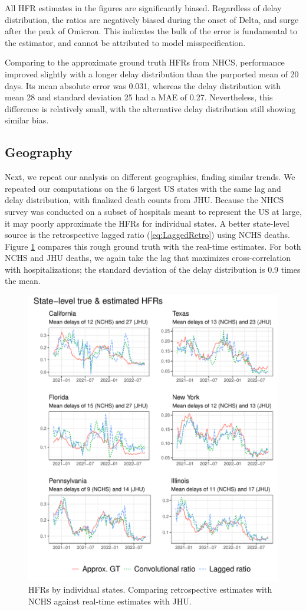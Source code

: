 \documentclass{article}
\begin{document}
All HFR estimates in the figures are significantly biased. Regardless of delay distribution, the ratios are negatively biased during the onset of Delta, and surge after the peak of Omicron. This indicates the bulk of the error is fundamental to the estimator, and cannot be attributed to model misspecification. 

Comparing to the approximate ground truth HFRs from NHCS, performance improved slightly with a longer delay distribution than the purported mean of 20 days. Its mean absolute error was 0.031, whereas the delay distribution with mean 28 and standard deviation 25 had a MAE of 0.27. Nevertheless, this difference is relatively small, with the alternative delay distribution still showing similar bias.

\subsection{Geography}

Next, we repeat our analysis on different geographies, finding similar trends. We repeated our computations on the 6 largest US states with the same lag and delay distribution, with finalized death counts from JHU. Because the NHCS survey was conducted on a subset of hospitals meant to represent the US at large, it may poorly approximate the HFRs for individual states. A better state-level source is the retrospective lagged ratio (\ref{eq:LaggedRetro}) using NCHS deaths. Figure \ref{fig:state-level} compares this rough ground truth with the real-time estimates. For both NCHS and JHU deaths, we again take the lag that maximizes cross-correlation with hospitalizations; the standard deviation of the delay distribution is 0.9 times the mean. 

 \begin{figure}
     \centering
     \includegraphics[width=0.8\linewidth]{Figures/Real/state_level_hfrs.pdf}
     \caption{HFRs by individual states. Comparing retrospective estimates with NCHS against real-time estimates with JHU.}
     \label{fig:state-level}
 \end{figure}
\end{document}
